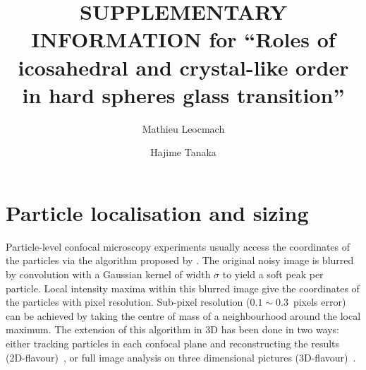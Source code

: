 \documentclass[prl,twocolumn,notitlepage]{revtex4-1}
\begin{document}
\title{SUPPLEMENTARY INFORMATION for ``Roles of icosahedral and crystal-like order \\ in hard spheres glass transition''} 


\author{Mathieu Leocmach} 

\author{Hajime Tanaka}


\maketitle

\section*{Particle localisation and sizing}

Particle-level confocal microscopy experiments usually access the coordinates of the particles via the algorithm proposed by \citet{Crocker1996}. The original noisy image is blurred by convolution with a Gaussian kernel of width $\sigma$ to yield a soft peak per particle. Local intensity maxima within this blurred image give the coordinates of the particles with pixel resolution. Sub-pixel resolution ($0.1\sim0.3$~pixels error) can be achieved by taking the centre of mass of a neighbourhood around the local maximum. The extension of this algorithm in 3D has been done in two ways: either tracking particles in each confocal plane and reconstructing the results (2D-flavour)~\citep{dinsmore2001tdc}, or full image analysis on three dimensional pictures (3D-flavour)~\citep{vanblaaderen1995rss, Lu2007}.
\end{document}
